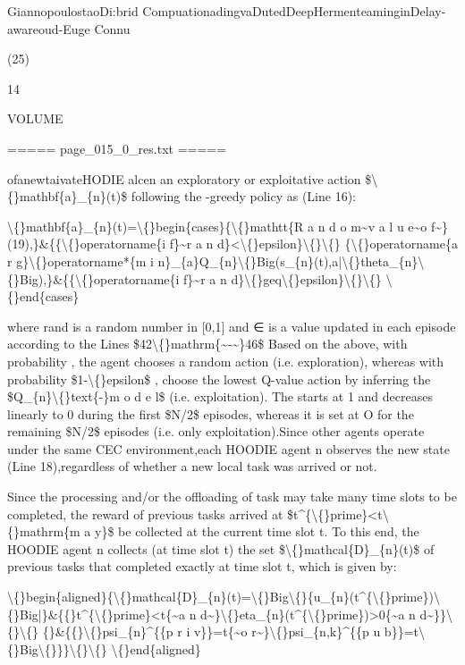\documentclass{article}
\begin{document}
GiannopoulostaoDi:brid CompuationadingvaDutedDeepHermenteaminginDelay-awareoud-Euge Connu

(25)

14

VOLUME

===== page\_015\_0\_res.txt =====


ofanewtaivateHODIE alcen an exploratory or exploitative action \$\textbackslash\{\}mathbf\{a\}\_\{n\}(t)\$ following the -greedy policy as (Line 16):

\textbackslash\{\}mathbf\{a\}\_\{n\}(t)=\textbackslash\{\}begin\{cases\}\{\textbackslash\{\}mathtt\{R a n d o m\textasciitilde{}v a l u e\textasciitilde{}o f\textasciitilde{}\}(19),\}\&\{\{\textbackslash\{\}operatorname\{i f\}\textasciitilde{}r a n d\}<\textbackslash\{\}epsilon\}\textbackslash\{\}\textbackslash\{\} \{\textbackslash\{\}operatorname\{a r g\}\textbackslash\{\}operatorname*\{m i n\}\_\{a\}Q\_\{n\}\textbackslash\{\}Big(s\_\{n\}(t),a|\textbackslash\{\}theta\_\{n\}\textbackslash\{\}Big),\}\&\{\{\textbackslash\{\}operatorname\{i f\}\textasciitilde{}r a n d\}\textbackslash\{\}geq\textbackslash\{\}epsilon\}\textbackslash\{\}\textbackslash\{\} \textbackslash\{\}end\{cases\}

where rand is a random number in [0,1] and ∈ is a value updated in each episode according to the Lines \$42\textbackslash\{\}mathrm\{\textasciitilde{}-\textasciitilde{}\}46\$ Based on the above, with probability , the agent chooses a random action (i.e. exploration), whereas with probability \$1-\textbackslash\{\}epsilon\$ , choose the lowest Q-value action by inferring the \$Q\_\{n\}\textbackslash\{\}text\{-\}m o d e l\$ (i.e. exploitation). The  starts at 1 and decreases linearly to 0 during the first \$N/2\$ episodes, whereas it is set at O for the remaining \$N/2\$ episodes (i.e. only exploitation).Since other agents operate under the same CEC environment,each HOODIE agent n observes the new state (Line 18),regardless of whether a new local task was arrived or not.

Since the processing and/or the offloading of task may take many time slots to be completed, the reward of previous tasks arrived at \$t\textasciicircum{}\{\textbackslash\{\}prime\}<t\textbackslash\{\}mathrm\{m a y\}\$ be collected at the current time slot t. To this end, the HOODIE agent n collects (at time slot t) the set \$\textbackslash\{\}mathcal\{D\}\_\{n\}(t)\$ of previous tasks that completed exactly at time slot t, which is given by:

\textbackslash\{\}begin\{aligned\}\{\textbackslash\{\}mathcal\{D\}\_\{n\}(t)=\textbackslash\{\}Big\textbackslash\{\}\{u\_\{n\}(t\textasciicircum{}\{\textbackslash\{\}prime\})\textbackslash\{\}Big|\}\&\{\{\}t\textasciicircum{}\{\textbackslash\{\}prime\}<t\{\textasciitilde{}a n d\textasciitilde{}\}\textbackslash\{\}eta\_\{n\}(t\textasciicircum{}\{\textbackslash\{\}prime\})>0\{\textasciitilde{}a n d\textasciitilde{}\}\}\textbackslash\{\}\textbackslash\{\} \{\}\&\{\{\}\textbackslash\{\}psi\_\{n\}\textasciicircum{}\{\{p r i v\}\}=t\{\textasciitilde{}o r\textasciitilde{}\}\textbackslash\{\}psi\_\{n,k\}\textasciicircum{}\{\{p u b\}\}=t\textbackslash\{\}Big\textbackslash\{\}\}\}\textbackslash\{\}\textbackslash\{\} \textbackslash\{\}end\{aligned\}
\end{document}
